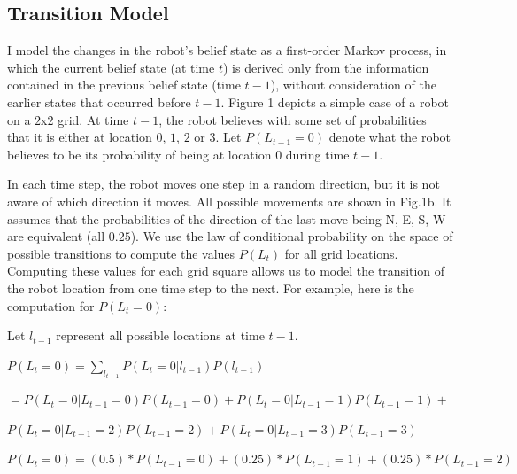 \documentclass{article}
\begin{document}
\subsection{Transition Model}

I model the changes in the robot's belief state as a first-order Markov process, in which the current belief state (at time $t$) is derived only from the information contained in the previous belief state (time $t-1$), without consideration of the earlier states that occurred before $t-1$. Figure 1 depicts a simple case of a robot on a $2$x$2$ grid. At time $t-1$, the robot believes with some set of probabilities that it is either at location $0$, $1$, $2$ or $3$. Let $P(L_{t-1} = 0)$ denote what the robot believes to be its probability of being at location $0$ during time $t-1$. 

\vspace{2mm}

In each time step, the robot moves one step in a random direction, but it is not aware of which direction it moves. All possible movements are shown in Fig.1b. It assumes that the probabilities of the direction of the last move being N, E, S, W are equivalent (all $0.25$). We use the law of conditional probability on the space of possible transitions to compute the values $P(L_t)$ for all grid locations. Computing these values for each grid square allows us to model the transition of the robot location from one time step to the next. For example, here is the computation for $P(L_t = 0)$:

\vspace{5mm}

Let $l_{t-1}$ represent all possible locations at time $t-1$.

\vspace{5mm}

$P(L_t=0) = \sum_{l_{t-1}}P(L_t=0 | l_{t-1})P(l_{t-1})$

\vspace{4mm}\hspace{17mm}$ = P(L_t=0 | L_{t-1}=0)P(L_{t-1} = 0) + P(L_t=0 | L_{t-1}=1)P(L_{t-1} = 1)  + $

\vspace{2mm}\hspace{22mm}$ P(L_t=0 | L_{t-1}=2)P(L_{t-1} = 2) + P(L_t=0 | L_{t-1}=3)P(L_{t-1} = 3) $

\vspace{4mm}$P(L_t=0) = (0.5)*P(L_{t-1} = 0) + (0.25)*P(L_{t-1} = 1) + (0.25)*P(L_{t-1} = 2) $
\end{document}
